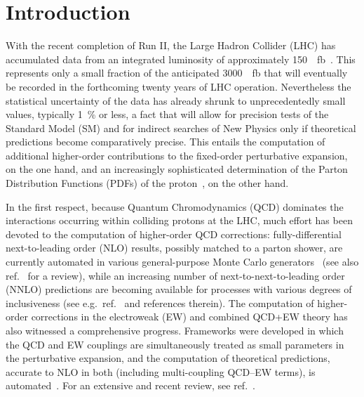 \section{Introduction}
\label{sec:introduction}

With the recent completion of Run II, the Large Hadron Collider (LHC) has 
accumulated data from an integrated luminosity of approximately 
\SI{150}{\per\femto\barn}~\cite{Mangano:2020icy}. This represents only a small fraction of
the anticipated \SI{3000}{\per\femto\barn} that will eventually be recorded in the
forthcoming twenty years of LHC operation. Nevertheless the statistical 
uncertainty of the data has already shrunk to unprecedentedly small values,
typically \SI{1}{\percent} or less, a fact that will allow for precision tests of the
Standard Model (SM) and for indirect searches of New Physics only if 
theoretical predictions become comparatively precise. This entails the 
computation of additional higher-order contributions to the fixed-order 
perturbative expansion, on the one hand, and an increasingly
sophisticated determination of the Parton Distribution Functions (PDFs) of the 
proton~\cite{Gao:2017yyd,Ethier:2020way}, on the other hand. 

In the first respect, because Quantum Chromodynamics (QCD) dominates the 
interactions occurring within colliding protons at the LHC, much effort 
has been devoted to the computation of higher-order QCD corrections: 
fully-differential next-to-leading order (NLO) results, possibly matched to a
parton shower, are currently automated in various general-purpose
Monte Carlo generators~\cite{Gleisberg:2008ta,Alwall:2014hca,Bellm:2015jjp}
(see also ref.~\cite{Buckley:2011ms} for a review),
while an increasing number of next-to-next-to-leading order (NNLO) predictions 
are becoming available for processes with various degrees of inclusiveness
(see e.g.\ ref.~\cite{Amoroso:2020lgh} and references therein). The computation
of higher-order corrections in the electroweak (EW) and combined QCD+EW theory has
also witnessed a comprehensive progress. Frameworks 
were developed in which the QCD and EW couplings are simultaneously treated as 
small parameters in the perturbative expansion, and the computation of 
theoretical predictions, accurate to NLO in both (including multi-coupling
QCD--EW terms), is automated~\cite{Kallweit:2014xda,Biedermann:2017yoi,Frederix:2018nkq}. For an extensive and recent review, see ref.~\cite{Denner:2019vbn}.

